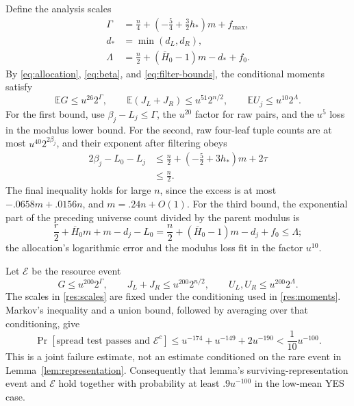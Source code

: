 Define the analysis scales
\begin{equation}\label{res:scales}
 \begin{aligned}
 \Gamma&=\frac n4+\left(-\frac54+\frac32h_*\right)m+f_{\max},\\
 d_*&=\min(d_L,d_R),\\
 \Lambda&=\frac n2+(\overline H_0-1)m-d_*+f_0.
 \end{aligned}
\end{equation}
By \eqref{eq:allocation}, \eqref{eq:beta}, and
\eqref{eq:filter-bounds}, the conditional moments satisfy
\begin{equation}\label{res:moments}
 \mathbb EG\le u^{26}2^\Gamma,\qquad
 \mathbb E(J_L+J_R)\le u^{51}2^{n/2},\qquad
 \mathbb EU_j\le u^{10}2^\Lambda.
\end{equation}
For the first bound, use \(\beta_j-L_j\le\Gamma\), the
\(u^{20}\) factor for raw pairs, and the \(u^5\) loss in the
modulus lower bound. For the second, raw four-leaf tuple counts are at
most \(u^{40}2^{2\beta_j}\), and their exponent after filtering obeys
\begin{equation}\label{res:tuple-exponent}
 \begin{aligned}
 2\beta_j-L_0-L_j
 &\le \frac n2+\left(-\frac52+3h_*\right)m+2\tau\\
 &\le \frac n2.
 \end{aligned}
\end{equation}
The final inequality holds for large \(n\), since the excess is at
most \(-.0658m+.0156n\), and \(m=.24n+O(1)\). For the third
bound, the exponential part of the preceding universe count divided by
the parent modulus is
\[
 \frac r2+\overline H_0m+m-d_j-L_0
 =\frac n2+(\overline H_0-1)m-d_j+f_0
 \le\Lambda;
\]
the allocation's logarithmic error and the modulus loss fit in the
factor \(u^{10}\).

Let \(\mathcal E\) be the resource event
\begin{equation}\label{eq:resource-event}
 G\le u^{200}2^\Gamma,\qquad
 J_L+J_R\le u^{200}2^{n/2},\qquad
 U_L,U_R\le u^{200}2^\Lambda.
\end{equation}
The scales in \eqref{res:scales} are fixed under the conditioning used
in \eqref{res:moments}. Markov's inequality and a union bound, followed
by averaging over that conditioning, give
\begin{equation}\label{res:joint-failure}
 \Pr[\text{spread test passes and }\mathcal E^c]
 \le u^{-174}+u^{-149}+2u^{-190}
 <\frac1{10}u^{-100}.
\end{equation}
This is a joint failure estimate, not an estimate conditioned on the
rare event in Lemma~\ref{lem:representation}. Consequently that lemma's
surviving-representation event and \(\mathcal E\) hold together with
probability at least \(.9u^{-100}\) in the low-mean YES case.


